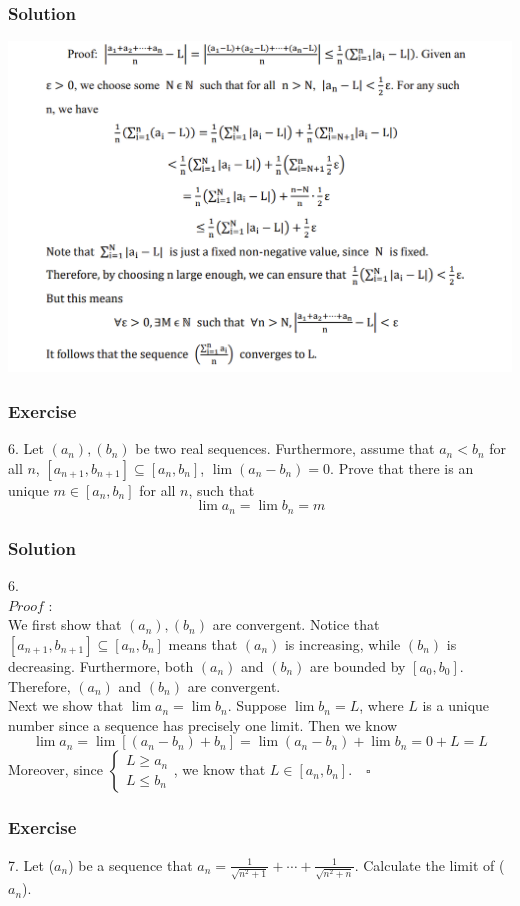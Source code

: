 \documentclass{beamer}
\begin{document}
    \begin{frame}
        \frametitle{Solution}
        \centering
        \includegraphics[height=0.8\textheight]{sol_4.png}
        
    \end{frame}
    
     \begin{frame}
        \frametitle{Exercise}
    6. Let $(a_n),(b_n)$ be two real sequences. Furthermore, assume that $a_n<b_n$
    for all $n$, $[a_{n+1}, b_{n+1}]\subseteq [a_n,b_n]$, $\lim (a_n-b_n)=0$. Prove that there 
    is an unique $m\in [a_n,b_n]$ for all $n$, such that 
    \begin{equation*}
        \lim a_n=\lim b_n=m
    \end{equation*}
    \end{frame}
    \begin{frame}
        \frametitle{Solution}
    6.\\
    $Proof$ : \\
    \hspace{1em} We first show that $(a_n),(b_n)$ are convergent. Notice that $[a_{n+1}, b_{n+1}]\subseteq [a_n,b_n]$ 
    means that $(a_n)$ is increasing, while $(b_n)$ is decreasing. Furthermore, both $(a_n)$ and $(b_n)$ are bounded by 
    $[a_0,b_0]$. Therefore, $(a_n)$ and $(b_n)$ are convergent.\\
    \hspace{1em} Next we show that $\lim a_n=\lim b_n$. Suppose $\lim b_n=L$, where $L$ is a unique number since a sequence 
    has precisely one limit. Then we know 
    \begin{equation*}
        \lim a_n=\lim [(a_n-b_n)+b_n]=\lim (a_n-b_n) + \lim b_n= 0+L=L
    \end{equation*}
    Moreover, since 
    $\begin{cases}
        L \geq a_n\\
        L \leq b_n
    \end{cases}$, we know that $L\in [a_n,b_n]$.$\quad\square$
    
    \end{frame}
    \begin{frame}
        \frametitle{Exercise}
        7. Let ($a_n$) be a sequence that $a_n=\frac{1}{\sqrt{n^2+1}}+\cdots+\frac{1}{\sqrt{n^2+n}}$.
        Calculate the limit of ($a_n$).    
    
    \end{frame}
    
\end{document}
